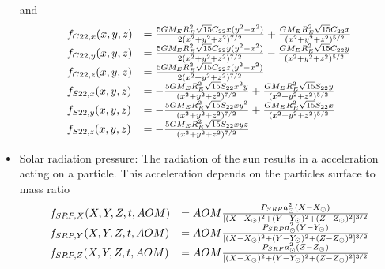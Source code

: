\documentclass[11pt,
               a4paper,
               bibtotoc,
               idxtotoc,
               headsepline,
               footsepline,
               footexclude,
               BCOR12mm,
               DIV13,
               openany,   %
               ]
               {scrbook}
\begin{document}
\begin{itemize}
\begin{equation}
        \end{equation}
        and
        \begin{equation}
            \begin{array}{ll}
                f_{C22,x}(x,y,z) &= {5GM_ER_E^2\sqrt{15}C_{22}x(y^2-x^2)\over 2(x^2+y^2+z^2)^{7/2}}+{GM_ER_E^2\sqrt{15}C_{22}x\over(x^2+y^2+z^2)^{5/2}} \\
                f_{C22,y}(x,y,z) &= {5GM_ER_E^2\sqrt{15}C_{22}y(y^2-x^2)\over 2(x^2+y^2+z^2)^{7/2}}-{GM_ER_E^2\sqrt{15}C_{22}y\over(x^2+y^2+z^2)^{5/2}} \\
                f_{C22,z}(x,y,z) &= {5GM_ER_E^2\sqrt{15}C_{22}z(y^2-x^2)\over 2(x^2+y^2+z^2)^{7/2}}\\
                f_{S22,x}(x,y,z) &= -{5GM_ER_E^2\sqrt{15}S_{22}x^2y\over (x^2+y^2+z^2)^{7/2}}+{GM_ER_E^2\sqrt{15}S_{22}y\over(x^2+y^2+z^2)^{5/2}} \\
                f_{S22,y}(x,y,z) &= -{5GM_ER_E^2\sqrt{15}S_{22}xy^2\over (x^2+y^2+z^2)^{7/2}}+{GM_ER_E^2\sqrt{15}S_{22}x\over(x^2+y^2+z^2)^{5/2}} \\
                f_{S22,z}(x,y,z) &= -{5GM_ER_E^2\sqrt{15}S_{22}xyz\over (x^2+y^2+z^2)^{7/2}}
            \end{array}
        \end{equation}

        \item Solar radiation pressure: The radiation of the sun results in a acceleration acting on a particle.
        This acceleration depends on the particles surface to mass ratio
        \begin{equation}
            \begin{array}{ll}
                f_{SRP,X}(X,Y,Z,t,AOM) &= AOM
                {P_{SRP}a_\odot^2(X-X_\odot)\over [(X-X_\odot)^2+(Y-Y_\odot)^2+(Z-Z_\odot)^2]^{3/2}}\\
                f_{SRP,Y}(X,Y,Z,t,AOM) &= AOM
                {P_{SRP}a_\odot^2(Y-Y_\odot)\over [(X-X_\odot)^2+(Y-Y_\odot)^2+(Z-Z_\odot)^2]^{3/2}}\\
                f_{SRP,Z}(X,Y,Z,t,AOM) &= AOM
                {P_{SRP}a_\odot^2(Z-Z_\odot)\over [(X-X_\odot)^2+(Y-Y_\odot)^2+(Z-Z_\odot)^2]^{3/2}}
            \end{array}
        \end{equation}


\end{itemize}
\end{document}
